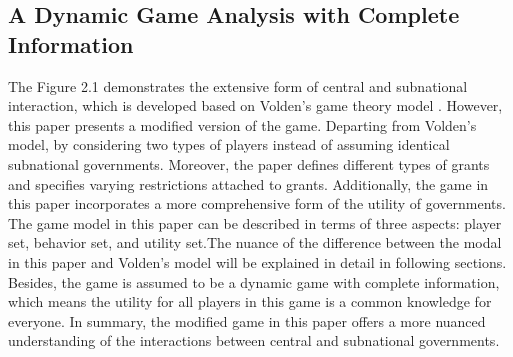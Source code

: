 \subsection{A Dynamic Game Analysis with Complete Information}
The Figure 2.1 demonstrates the extensive form of central and subnational interaction, which is developed based on Volden's game theory model \cite{volden2007intergovernmental}. However, this paper presents a modified version of the game. Departing from Volden's model, by considering two types of players instead of assuming identical subnational governments. Moreover, the paper defines different types of grants and specifies varying restrictions attached to grants. Additionally, the game in this paper incorporates a more comprehensive form of the utility of governments. The game model in this paper can be described in terms of three aspects: player set, behavior set, and utility set.The nuance of the difference between the modal in this paper and Volden's model will be explained in detail in following sections. Besides, the game is assumed to be a dynamic game with complete information, which means the utility for all players in this game is a common knowledge for everyone. In summary, the modified game in this paper offers a more nuanced understanding of the interactions between central and subnational governments.

